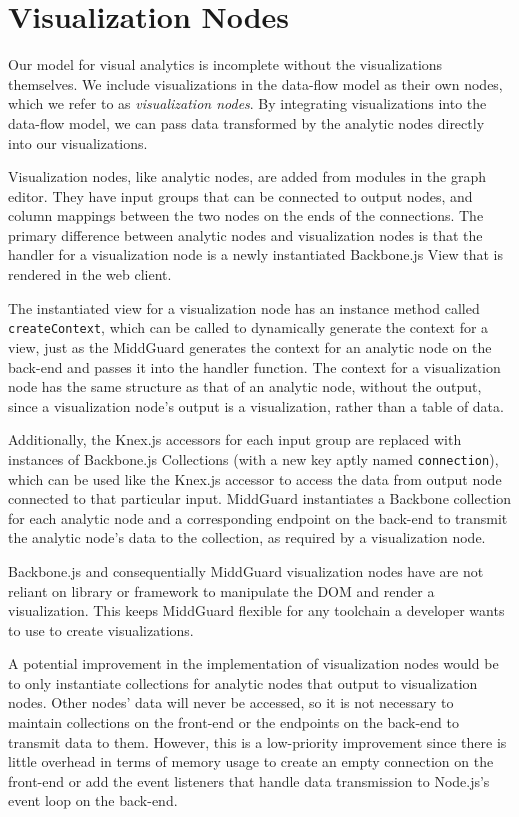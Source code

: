 \documentclass[midd]{thesis}
\begin{document}
\section{Visualization Nodes}

Our model for visual analytics is incomplete without the visualizations
themselves. We include visualizations in the data-flow model as their own nodes,
which we refer to as \textit{visualization nodes}. By integrating visualizations
into the data-flow model, we can pass data transformed by the analytic nodes
directly into our visualizations.

Visualization nodes, like analytic nodes, are added from modules in the graph
editor. They have input groups that can be connected to output nodes, and column
mappings between the two nodes on the ends of the connections. The primary
difference between analytic nodes and visualization nodes is that the handler
for a visualization node is a newly instantiated Backbone.js View
\cite{backbone} that is rendered in the web client.

The instantiated view for a visualization node has an instance method called\\
\texttt{createContext}, which can be called to dynamically generate the context
for a view, just as the MiddGuard generates the context for an analytic node on
the back-end and passes it into the handler function. The context for a
visualization node has the same structure as that of an analytic node, without
the output, since a visualization node's output is a visualization, rather than
a table of data.

Additionally, the Knex.js accessors for each input group are replaced with
instances of Backbone.js Collections (with a new key aptly named
\texttt{connection}), which can be used like the Knex.js accessor to access the
data from output node connected to that particular input. MiddGuard instantiates
a Backbone collection for each analytic node and a corresponding endpoint on the
back-end to transmit the analytic node's data to the collection, as required by
a visualization node.

Backbone.js and consequentially MiddGuard visualization nodes have are not
reliant on library or framework to manipulate the DOM and render a
visualization. This keeps MiddGuard flexible for any toolchain a developer wants
to use to create visualizations.

A potential improvement in the implementation of visualization nodes would be to
only instantiate collections for analytic nodes that output to visualization
nodes. Other nodes' data will never be accessed, so it is not necessary to
maintain collections on the front-end or the endpoints on the back-end to
transmit data to them. However, this is a low-priority improvement since there
is little overhead in terms of memory usage to create an empty connection on the
front-end or add the event listeners that handle data transmission to Node.js's
event loop on the back-end.
\end{document}

